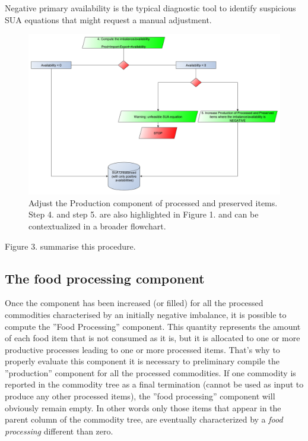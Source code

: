 \documentclass[nojss]{jss}
\begin{document}
Negative primary availability is the typical diagnostic tool to identify suspicious SUA equations that might request a manual adjustment.

\begin{figure}
\includegraphics{flow-charts/balancing/balanceNegativeAvailability.pdf}
\caption{Adjust the Production component of processed and preserved items. Step 4. and step 5. are also highlighted in Figure 1. and can be contextualized in a broader flowchart.}
\end{figure}

Figure 3. summarise this procedure. 

\subsection{The food processing component}
Once the   component has been increased (or filled) for all the processed commodities characterised by an initially negative imbalance, it is possible to compute the ''Food Processing'' component. This quantity represents the amount of each food item that is not consumed as it is, but it is allocated to one or more productive processes leading to one or more processed items. That's why to properly evaluate this component it is necessary to preliminary compile the ''production'' component for all the processed commodities. If one commodity is reported in the commodity tree as a final termination (cannot be used as input to produce any other processed items), the ''food processing'' component will obviously remain empty. In other words only those items that appear in the parent column of the commodity tree, are eventually characterized by a \textit{food processing} different than zero.
\end{document}
